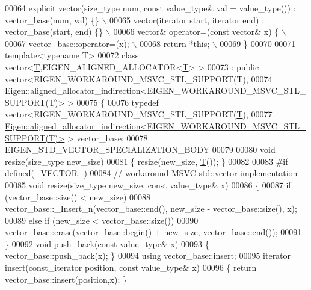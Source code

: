 \begin{DoxyCode}
00064 \textcolor{preprocessor}{    explicit vector(size\_type num, const value\_type& val = value\_type()) : vector\_base(num, val) \{\} \(\backslash\)}
00065 \textcolor{preprocessor}{    vector(iterator start, iterator end) : vector\_base(start, end) \{\}  \(\backslash\)}
00066 \textcolor{preprocessor}{    vector& operator=(const vector& x) \{  \(\backslash\)}
00067 \textcolor{preprocessor}{      vector\_base::operator=(x);  \(\backslash\)}
00068 \textcolor{preprocessor}{      return *this;  \(\backslash\)}
00069 \textcolor{preprocessor}{    \}}
00070 
00071   \textcolor{keyword}{template}<\textcolor{keyword}{typename} T>
00072   \textcolor{keyword}{class }vector<\hyperlink{group___sparse_core___module_class_eigen_1_1_triplet}{T},EIGEN\_ALIGNED\_ALLOCATOR<\hyperlink{group___sparse_core___module_class_eigen_1_1_triplet}{T}> >
00073     : \textcolor{keyword}{public} vector<EIGEN\_WORKAROUND\_MSVC\_STL\_SUPPORT(T),
00074                     Eigen::aligned\_allocator\_indirection<EIGEN\_WORKAROUND\_MSVC\_STL\_SUPPORT(T)> >
00075 \{
00076   \textcolor{keyword}{typedef} vector<EIGEN\_WORKAROUND\_MSVC\_STL\_SUPPORT(\hyperlink{group___sparse_core___module_class_eigen_1_1_triplet}{T}),
00077                  
      \hyperlink{class_eigen_1_1aligned__allocator__indirection}{Eigen::aligned\_allocator\_indirection<EIGEN\_WORKAROUND\_MSVC\_STL\_SUPPORT(T)>}
       > vector\_base;
00078   EIGEN\_STD\_VECTOR\_SPECIALIZATION\_BODY
00079 
00080   \textcolor{keywordtype}{void} resize(size\_type new\_size)
00081   \{ resize(new\_size, \hyperlink{group___sparse_core___module_class_eigen_1_1_triplet}{T}()); \}
00082 
00083 \textcolor{preprocessor}{#if defined(\_VECTOR\_)}
00084   \textcolor{comment}{// workaround MSVC std::vector implementation}
00085   \textcolor{keywordtype}{void} resize(size\_type new\_size, \textcolor{keyword}{const} value\_type& x)
00086   \{
00087     \textcolor{keywordflow}{if} (vector\_base::size() < new\_size)
00088       vector\_base::\_Insert\_n(vector\_base::end(), new\_size - vector\_base::size(), x);
00089     \textcolor{keywordflow}{else} \textcolor{keywordflow}{if} (new\_size < vector\_base::size())
00090       vector\_base::erase(vector\_base::begin() + new\_size, vector\_base::end());
00091   \}
00092   \textcolor{keywordtype}{void} push\_back(\textcolor{keyword}{const} value\_type& x)
00093   \{ vector\_base::push\_back(x); \} 
00094   \textcolor{keyword}{using} vector\_base::insert;  
00095   iterator insert(const\_iterator position, \textcolor{keyword}{const} value\_type& x)
00096   \{ \textcolor{keywordflow}{return} vector\_base::insert(position,x); \}

\end{DoxyCode}
